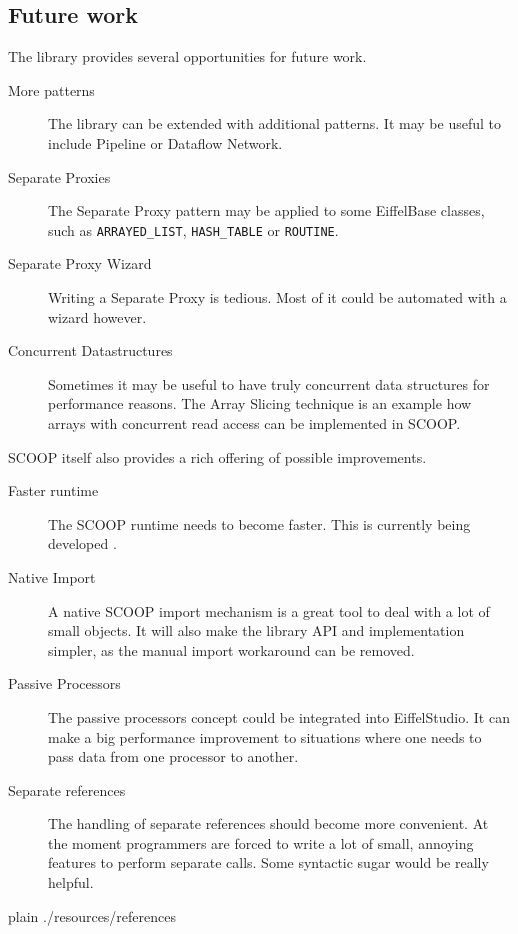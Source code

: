 \documentclass[a4paper,10pt,titlepage]{article}
\begin{document}
\subsection{Future work}

The library provides several opportunities for future work.

\begin{description}
 \item [More patterns] The library can be extended with additional patterns.
 It may be useful to include Pipeline or Dataflow Network.
 \item [Separate Proxies] The Separate Proxy pattern may be applied to some EiffelBase classes, such as \lstinline!ARRAYED_LIST!, \lstinline!HASH_TABLE! or \lstinline!ROUTINE!.
 \item [Separate Proxy Wizard] Writing a Separate Proxy is tedious. Most of it could be automated with a wizard however.
 \item [Concurrent Datastructures] Sometimes it may be useful to have truly concurrent data structures for performance reasons.
The Array Slicing technique \cite{paper:array-slicing} is an example how arrays with concurrent read access can be implemented in SCOOP.
\end{description}

SCOOP itself also provides a rich offering of possible improvements.

\begin{description}
 \item [Faster runtime] The SCOOP runtime needs to become faster. 
 This is currently being developed \cite{thesis:scottwest}.
 \item [Native Import] A native SCOOP import mechanism is a great tool to deal with a lot of small objects.
 It will also make the library API and implementation simpler, as the manual import workaround can be removed.
 \item [Passive Processors] The passive processors concept \cite{paper:passive-processors} could be integrated into EiffelStudio.
 It can make a big performance improvement to situations where one needs to pass data from one processor to another.
 \item [Separate references] The handling of separate references should become more convenient.
 At the moment programmers are forced to write a lot of small, annoying features to perform separate calls.
 Some syntactic sugar would be really helpful.
\end{description}

\newpage
\begin{appendices}



\end{appendices}

\newpage
{}
{}
\begin{flushleft}
{{{
 {plain}
 {./resources/references}
}}}
\end{flushleft}
\end{document}
